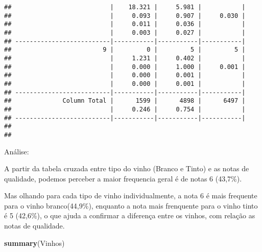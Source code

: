 \documentclass[]{article}
\newenvironment{Shaded}{\begin{snugshade}}{\end{snugshade}}
\newcommand{\KeywordTok}[1]{\textcolor[rgb]{0.13,0.29,0.53}{\textbf{#1}}}
\newcommand{\NormalTok}[1]{#1}
\begin{document}
\begin{verbatim}
##                           |    18.321 |     5.981 |           | 
##                           |     0.093 |     0.907 |     0.030 | 
##                           |     0.011 |     0.036 |           | 
##                           |     0.003 |     0.027 |           | 
## --------------------------|-----------|-----------|-----------|
##                         9 |         0 |         5 |         5 | 
##                           |     1.231 |     0.402 |           | 
##                           |     0.000 |     1.000 |     0.001 | 
##                           |     0.000 |     0.001 |           | 
##                           |     0.000 |     0.001 |           | 
## --------------------------|-----------|-----------|-----------|
##              Column Total |      1599 |      4898 |      6497 | 
##                           |     0.246 |     0.754 |           | 
## --------------------------|-----------|-----------|-----------|
## 
## 
\end{verbatim}

Análise:

A partir da tabela cruzada entre tipo do vinho (Branco e Tinto) e as
notas de qualidade, podemos perceber a maior frequencia geral é de notas
6 (43,7\%).

Mas olhando para cada tipo de vinho individualmente, a nota 6 é mais
frequente para o vinho branco(44,9\%), enquanto a nota mais frenquente
para o vinho tinto é 5 (42,6\%), o que ajuda a confirmar a diferença
entre os vinhos, com relação as notas de qualidade.

\begin{Shaded}
\begin{Highlighting}[]
\KeywordTok{summary}\NormalTok{(Vinhos)}
\end{Highlighting}
\end{Shaded}
\end{document}
